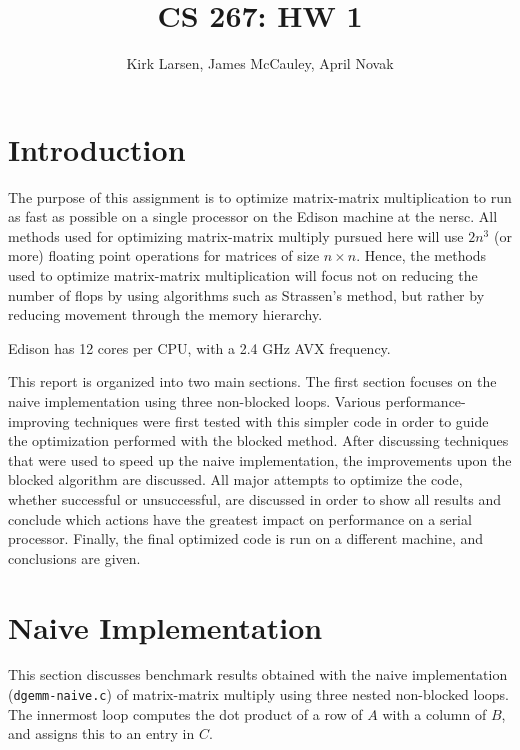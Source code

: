 \documentclass[10pt]{article}
\begin{document}
\title{CS 267: HW 1}
\author{Kirk Larsen, James McCauley, April Novak}

\maketitle

\section{Introduction}

The purpose of this assignment is to optimize matrix-matrix multiplication to run as fast as possible on a single processor on the Edison machine at the \gls{nersc}. All methods used for optimizing matrix-matrix multiply pursued here will use \(2n^3\) (or more) floating point operations for matrices of size \(n\times n\). Hence, the methods used to optimize matrix-matrix multiplication will focus not on reducing the number of flops by using algorithms such as Strassen's method, but rather by reducing movement through the memory hierarchy. 

Edison has 12 cores per CPU, with a 2.4 GHz AVX frequency. 

This report is organized into two main sections. The first section focuses on the naive implementation using three non-blocked loops. Various performance-improving techniques were first tested with this simpler code in order to guide the optimization performed with the blocked method. After discussing techniques that were used to speed up the naive implementation, the improvements upon the blocked algorithm are discussed. All major attempts to optimize the code, whether successful or unsuccessful, are discussed in order to show all results and conclude which actions have the greatest impact on performance on a serial processor. Finally, the final optimized code is run on a different machine, and conclusions are given.

\section{Naive Implementation}

This section discusses benchmark results obtained with the naive implementation ({\tt dgemm-naive.c}) of matrix-matrix multiply using three nested non-blocked loops. The innermost loop computes the dot product of a row of \(A\) with a column of \(B\), and assigns this to an entry in \(C\). 
\end{document}
